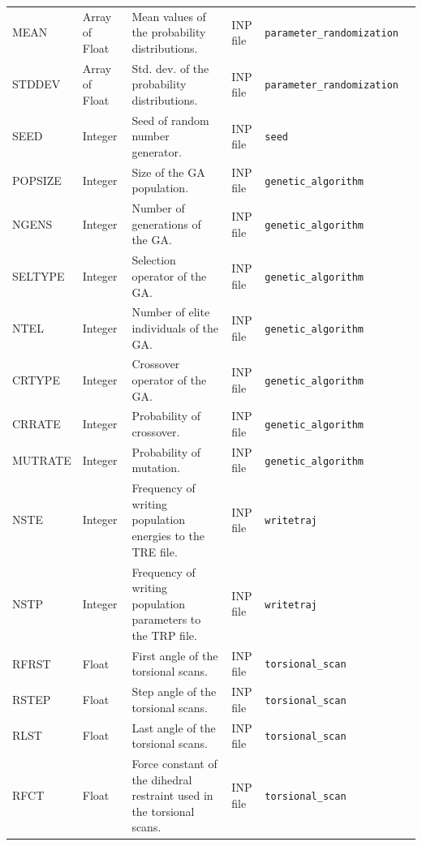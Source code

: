 \documentclass[10pt,a4paper,openany]{memoir}
\numberwithin{equation}{section}
\begin{document}
\begin{landscape}
\begin{center}
\begin{longtable}{llllll}
      MEAN & Array of Float & Mean values of the probability distributions. & INP file & \texttt{parameter\_randomization} & \autopageref{descr:mean}\\
      STDDEV & Array of Float & Std. dev. of the probability distributions. & INP file & \texttt{parameter\_randomization} & \autopageref{descr:stddev}\\
      SEED & Integer & Seed of random number generator. & INP file & \texttt{seed} & \autopageref{descr:seed}\\
      POPSIZE & Integer & Size of the GA population. & INP file & \texttt{genetic\_algorithm} & \autopageref{descr:popsize}\\
      NGENS & Integer & Number of generations of the GA. & INP file & \texttt{genetic\_algorithm} & \autopageref{descr:ngens}\\
      SELTYPE & Integer & Selection operator of the GA. & INP file & \texttt{genetic\_algorithm} & \autopageref{descr:seltype}\\
      NTEL & Integer & Number of elite individuals of the GA. & INP file & \texttt{genetic\_algorithm} & \autopageref{descr:ntel}\\
      CRTYPE & Integer & Crossover operator of the GA. & INP file & \texttt{genetic\_algorithm} & \autopageref{descr:crtype}\\
      CRRATE & Integer & Probability of crossover. & INP file & \texttt{genetic\_algorithm} & \autopageref{descr:crrate}\\
      MUTRATE & Integer & Probability of mutation. & INP file & \texttt{genetic\_algorithm} & \autopageref{descr:mutrate}\\
      NSTE & Integer & Frequency of writing population energies to the TRE file. & INP file & \texttt{writetraj} & \autopageref{descr:nste}\\
      NSTP & Integer & Frequency of writing population parameters to the TRP file. & INP file & \texttt{writetraj} & \autopageref{descr:nstp}\\
      RFRST & Float & First angle of the torsional scans. & INP file & \texttt{torsional\_scan} & \autopageref{descr:rfrst}\\
      RSTEP & Float & Step angle of the torsional scans. & INP file & \texttt{torsional\_scan} & \autopageref{descr:rstep}\\
      RLST & Float & Last angle of the torsional scans. & INP file & \texttt{torsional\_scan} & \autopageref{descr:rlst}\\
      RFCT & Float & Force constant of the dihedral restraint used in the torsional scans. & INP file & \texttt{torsional\_scan} & \autopageref{descr:rfct}\\

\end{longtable}
\end{center}
\end{landscape}
\end{document}
